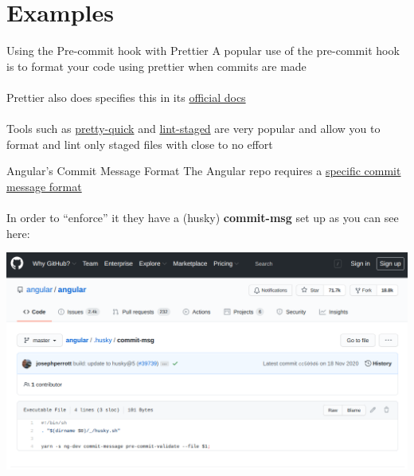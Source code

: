 \documentclass[11pt]{beamer}
\begin{document}
\section{Examples}



\begin{frame}{Using the Pre-commit hook with Prettier}
  A popular use of the pre-commit hook is to format your code using prettier when commits are made
  \\~\\
  Prettier also does specifies this in its {\color{purple} \href{https://prettier.io/docs/en/precommit.html}{official docs}}
  \\~\\
  Tools such as 
  {\color{purple} \href{https://github.com/azz/pretty-quick}{pretty-quick}}
  and
  {\color{purple} \href{https://github.com/okonet/lint-staged}{lint-staged}}
  are very popular and allow you to format and lint only staged files with close to no effort
\end{frame}



\begin{frame}{Angular's Commit Message Format}
  The Angular repo requires a
  {\color{purple} \href{https://github.com/angular/angular/blob/master/CONTRIBUTING.md\#commit}{specific commit message format}}
  \\~\\
  In order to ``enforce'' it they have a (husky) \textbf{commit-msg} set up as you can see here: 

  \begin{center}
   \href{https://github.com/angular/angular/blob/master/.husky/commit-msg}{
      \includegraphics[scale=0.2]{angular-commit-msg.png}
   }
  \end{center}
\end{frame}
\end{document}
